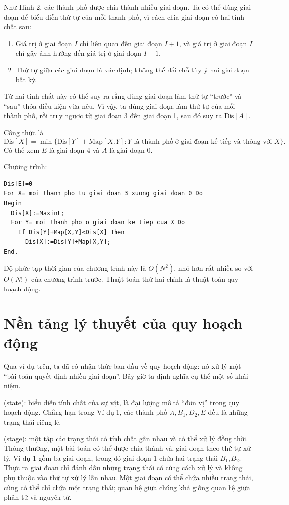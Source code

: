 \documentclass[11pt]{article}
\begin{document}
Như Hình 2, các thành phố được chia thành nhiều giai đoạn. Ta có thể dùng
giai đoạn để biểu diễn thứ tự của mỗi thành phố, vì cách chia giai đoạn có
hai tính chất sau:
\begin{enumerate}
  \item Giá trị ở giai đoạn \(I\) chỉ liên quan đến giai đoạn \(I+1\), và giá
  trị ở giai đoạn \(I\) chỉ gây ảnh hưởng đến giá trị ở giai đoạn \(I-1\).
  \item Thứ tự giữa các giai đoạn là xác định; không thể đổi chỗ tùy ý hai
  giai đoạn bất kỳ.
\end{enumerate}
Từ hai tính chất này có thể suy ra rằng dùng giai đoạn làm thứ tự ``trước'' và
``sau'' thỏa điều kiện vừa nêu. Vì vậy, ta dùng giai đoạn làm thứ tự của mỗi
thành phố, rồi truy ngược từ giai đoạn 3 đến giai đoạn 1, sau đó suy ra
\(\mathrm{Dis}[A]\).

Công thức là
\[
  \mathrm{Dis}[X]=
  \min\{\mathrm{Dis}[Y]+\mathrm{Map}[X,Y]:
  Y \text{ là thành phố ở giai đoạn kế tiếp và thông với } X\}.
\]
Có thể xem \(E\) là giai đoạn 4 và \(A\) là giai đoạn 0.

Chương trình:
\begin{verbatim}
Dis[E]=0
For X= moi thanh pho tu giai doan 3 xuong giai doan 0 Do
Begin
  Dis[X]:=Maxint;
  For Y= moi thanh pho o giai doan ke tiep cua X Do
    If Dis[Y]+Map[X,Y]<Dis[X] Then
      Dis[X]:=Dis[Y]+Map[X,Y];
End.
\end{verbatim}

Độ phức tạp thời gian của chương trình này là \(O(N^2)\), nhỏ hơn rất nhiều
so với \(O(N!)\) của chương trình trước. Thuật toán thứ hai chính là thuật
toán quy hoạch động.

\section{Nền tảng lý thuyết của quy hoạch động}

Qua ví dụ trên, ta đã có nhận thức ban đầu về quy hoạch động: nó xử lý một
``bài toán quyết định nhiều giai đoạn''. Bây giờ ta định nghĩa cụ thể một số
khái niệm.

 (state): biểu diễn tính chất của sự vật, là đại lượng mô tả
``đơn vị'' trong quy hoạch động. Chẳng hạn trong Ví dụ 1, các thành phố
\(A,B_1,D_2,E\) đều là những trạng thái riêng lẻ.

 (stage): một tập các trạng thái có tính chất gần nhau và có
thể xử lý đồng thời. Thông thường, một bài toán có thể được chia thành vài
giai đoạn theo thứ tự xử lý. Ví dụ 1 gồm ba giai đoạn, trong đó giai đoạn 1
chứa hai trạng thái \(B_1,B_2\). Thực ra giai đoạn chỉ đánh dấu những trạng
thái có cùng cách xử lý và không phụ thuộc vào thứ tự xử lý lẫn nhau. Một
giai đoạn có thể chứa nhiều trạng thái, cũng có thể chỉ chứa một trạng thái;
quan hệ giữa chúng khá giống quan hệ giữa phân tử và nguyên tử.
\end{document}
